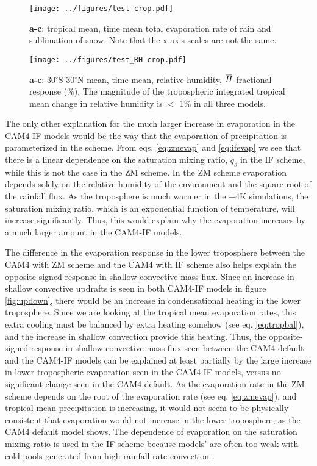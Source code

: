 \documentclass[letterpaper,12pt,titlepage,oneside,final]{book}
\newcommand{\overbar}[1]{\mkern 1.5mu\overline{\mkern-1.5mu#1\mkern-1.5mu}\mkern 1.5mu}
\begin{document}
\begin{figure}[H]
\centering
\noindent\texttt{[image: ../figures/test-crop.pdf]}\hfill
\caption{\footnotesize \footnotesize \textbf{a-c}: tropical mean, time mean total evaporation rate of rain and sublimation of snow. Note that the x-axis scales are not the same.}
\label{fig:evap}
\end{figure}
\begin{figure}[H]
\centering
\noindent\texttt{[image: ../figures/test\_RH-crop.pdf]}\hfill
\caption{\footnotesize \footnotesize \textbf{a-c}: 30$^{\circ}$S-30$^{\circ}$N mean, time mean, relative humidity, $\overbar{H}$ fractional response (\%). The magnitude of the tropospheric integrated tropical mean change in relative humidity is $<$ 1\% in all three models. }
\label{fig:RH}
\end{figure}
\newpage
The only other explanation for the much larger increase in evaporation in the CAM4-IF models would be the way that the evaporation of precipitation is parameterized in the scheme. From eqs. \ref{eq:zmevap} and \ref{eq:ifevap} we see that there is a linear dependence on the saturation mixing ratio, $q_{s}$ in the IF scheme, while this is not the case in the ZM scheme. In the ZM scheme evaporation depends solely on the relative humidity of the environment and the square root of the rainfall flux. As the troposphere is much warmer in the +4K simulations, the saturation mixing ratio, which is an exponential function of temperature, will increase significantly. Thus, this would explain why the evaporation increases by a much larger amount in the CAM4-IF models.

The difference in the evaporation response in the lower troposphere between the CAM4 with ZM scheme and the CAM4 with IF scheme also helps explain the opposite-signed response in shallow convective mass flux. Since an increase in shallow convective updrafts is seen in both CAM4-IF models in figure \ref{fig:updown}, there would be an increase in condensational heating in the lower troposphere. Since we are looking at the tropical mean evaporation rates, this extra cooling must be balanced by extra heating somehow (see eq. \ref{eq:tropbal}), and the increase in shallow convection provide this heating. Thus, the opposite-signed response in shallow convective mass flux seen between the CAM4 default and the CAM4-IF models can be explained at least partially by the large increase in lower tropospheric evaporation seen in the CAM4-IF models, versus no significant change seen in the CAM4 default. As the evaporation rate in the ZM scheme depends on the root of the evaporation rate (see eq. \ref{eq:zmevap}), and tropical mean precipitation is increasing, it would not seem to be physically consistent that evaporation would not increase in the lower troposphere, as the CAM4 default model shows. The dependence of evaporation on the saturation mixing ratio is used in the IF scheme because models' are often too weak with cold pools generated from high rainfall rate convection \citep{mitovski_temperature_2010}.
\end{document}

